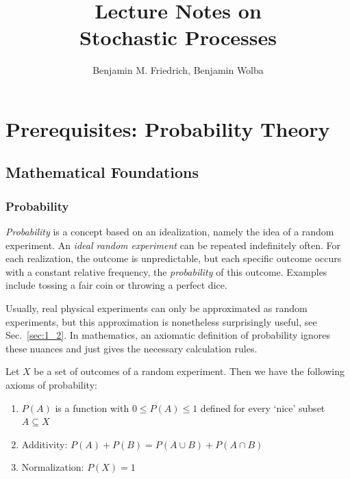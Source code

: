 \documentclass{notebook}
\title{\color{bluebase} Lecture Notes on\\ Stochastic Processes}
\author{Benjamin M. Friedrich, Benjamin Wolba}
\begin{document}
	
	
\frontmatter

\maketitle

\tableofcontents

\mainmatter

\chapter{Prerequisites: Probability Theory}

\section{Mathematical Foundations}
\label{sec:1_1}

\subsection*{Probability}

\textit{Probability} is a concept based on an idealization, namely the idea of a random experiment.  An \textit{ideal random experiment} can be repeated indefinitely often. For each realization, the outcome is unpredictable, but each specific outcome occurs with a constant relative frequency, the \textit{probability} of this outcome. Examples include tossing a fair coin or throwing a perfect dice.

Usually, real physical experiments can only be approximated as random experiments,  but this approximation is nonetheless surprisingly useful, see Sec.~\ref{sec:1_2}. In mathematics, an axiomatic definition of probability ignores these nuances  and just gives the necessary calculation rules. 

\begin{theorem}
	Let $X$ be a set of outcomes of a random experiment. Then we have the following axioms of probability:
	\begin{enumerate}
		\item{$P(A)$ is a function with $0 \leq P(A) \leq 1$ defined for every `nice' subset $A \subseteq X$}
		\item{Additivity: $P(A) + P(B) = P(A \cup B) + P(A \cap B)$}
		\item{Normalization: $P(X) = 1$}
	\end{enumerate}
\end{theorem}
\end{document}
